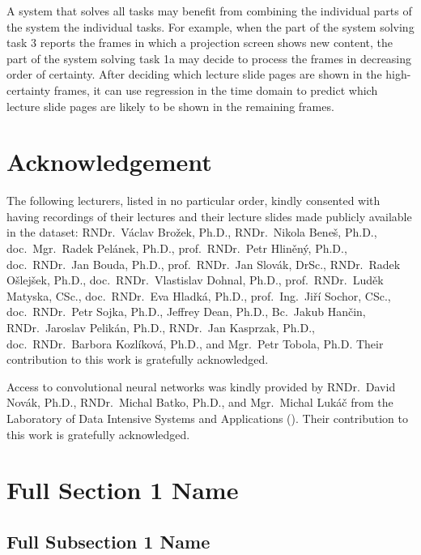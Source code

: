 A system that solves all tasks may benefit from combining the individual parts
of the system the individual tasks. For example, when the part of the system
solving task 3 reports the frames in which a projection screen shows new
content, the part of the system solving task 1a may decide to process the
frames in decreasing order of certainty. After deciding which lecture slide
pages are shown in the high-certainty frames, it can use regression in the time
domain to predict which lecture slide pages are likely to be shown in the
remaining frames.

\section*{Acknowledgement}
The following lecturers, listed in no particular order, kindly consented with
having recordings of their lectures and their lecture slides made publicly
available in the dataset:
RNDr.\ Václav Brožek, Ph.D.,
RNDr.\ Nikola Beneš, Ph.D.,
doc.\ Mgr.\ Radek Pelánek, Ph.D.,
prof.\ RNDr.\ Petr Hliněný, Ph.D.,
doc.\ RNDr.\ Jan Bouda, Ph.D.,
prof.\ RNDr.\ Jan Slovák, DrSc.,
RNDr.\ Radek Ošlejšek, Ph.D.,
doc.\ RNDr.\ Vlastislav Dohnal, Ph.D.,
prof.\ RNDr.\ Luděk Matyska, CSc.,
doc.\ RNDr.\ Eva Hladká, Ph.D.,
prof.\ Ing.\ Jiří Sochor, CSc.,
doc.\ RNDr.\ Petr Sojka, Ph.D.,
Jeffrey Dean, Ph.D.,
Bc.\ Jakub Hančin,
RNDr.\ Jaroslav Pelikán, Ph.D.,
RNDr.\ Jan Kasprzak, Ph.D.,
doc.\ RNDr.\ Barbora Kozlíková, Ph.D., and
Mgr.\ Petr Tobola, Ph.D.
Their contribution to this work is gratefully acknowledged.

Access to  convolutional neural networks was kindly provided by
RNDr.\ David Novák, Ph.D.,
RNDr.\ Michal Batko, Ph.D., and
Mgr.\ Michal Lukáč
from the Laboratory of Data Intensive Systems and Applications ().
Their contribution to this work is gratefully acknowledged.

\iffalse

\section[Short Section 1 Name]{Full Section 1 Name}
\subsection[Short Subsection 1 Name]{Full Subsection 1 Name}

